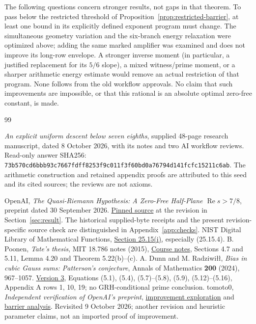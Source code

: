 \documentclass[12pt]{article}
\newcommand{\Rea}{\operatorname{Re}}
\begin{document}
The following questions concern stronger results, not gaps in that
theorem.  To pass below the restricted threshold of
Proposition~\ref{prop:restricted-barrier}, at least one bound in
its explicitly defined exponent program must change.
The simultaneous geometry variation and the six-branch energy
relaxation were optimized above; adding the same marked amplifier
was examined and does not improve its long-row envelope.
A stronger inverse moment (in particular, a justified replacement
for its \(5/6\) slope), a mixed witness/prime moment, or a sharper
arithmetic energy estimate would remove an actual restriction of
that program.  None follows from the old workflow approvals.
No claim that such improvements are impossible, or that this
rational is an absolute optimal zero-free constant, is made.
\begin{thebibliography}{99}

\emph{An explicit uniform descent below seven eighths},
supplied 48-page research manuscript, dated 8 October 2026,
with its notes and two AI workflow reviews.
Read-only answer SHA256:
\nolinkurl{73b570cd6bbb93c7667fdff8253f9c011f3f60bd0a76794d141fcfc15211c6ab}.
The arithmetic construction and retained appendix proofs are
attributed to this seed and its cited sources; the reviews are
not axioms.

OpenAI, \emph{The Quasi-Riemann Hypothesis: A Zero-Free Half-Plane
\(\Rea s>7/8\)}, preprint dated 30 September 2026.
\href{https://raw.githubusercontent.com/openai/math/fd4aeeb2ee4fc729c18d98444fed42fd0529eeeb/preprints/The-Quasi-Riemann-Hypothesis-September-30-2026/build/paper.tex}{Pinned source}
at the revision in Section~\ref{sec:result}.
The historical supplied-byte receipts and the present
revision-specific source check are distinguished in Appendix~\ref{app:checks}.
NIST Digital Library of Mathematical Functions,
\href{https://dlmf.nist.gov/25.15}{Section 25.15(i)},
especially (25.15.4).
B. Poonen, \emph{Tate's thesis}, MIT 18.786 notes (2015),
\href{https://math.mit.edu/~poonen/786/notes.pdf}{Course notes},
Sections 4.7 and 5.11, Lemma 4.20 and Theorem 5.22(b)--(c).
A. Dunn and M. Radziwi\l\l,
\emph{Bias in cubic Gauss sums: Patterson's conjecture},
Annals of Mathematics \textbf{200} (2024), 967--1057.
\href{https://arxiv.org/pdf/2109.07463v3}{Version 3},
Equations (5.1), (5.4), (5.7)--(5.8), (5.9), (5.12)--(5.16),
Appendix A rows 1, 10, 19; no GRH-conditional prime conclusion.
tomoto0, \emph{Independent verification of OpenAI's preprint},
\href{https://github.com/tomoto0/quasi-riemann-hypothesis-7-8-verification/blob/main/reports/improvement_exploration.md}{improvement exploration}
and
\href{https://github.com/tomoto0/quasi-riemann-hypothesis-7-8-verification/blob/main/reports/barrier_analysis.md}{barrier analysis}.
Revisited 9 October 2026; another revision and heuristic parameter
claims, not an imported proof of improvement.


\end{thebibliography}
\end{document}
